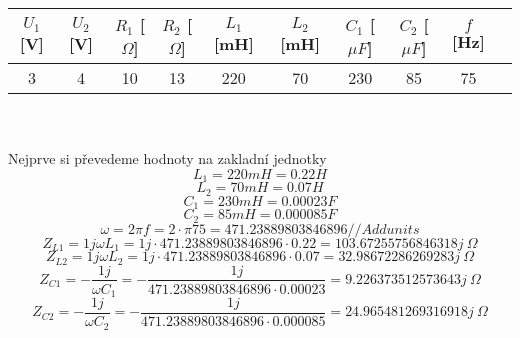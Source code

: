 \documentclass{article}
\begin{document}
\begin{tabular}{| c | c | c | c | c | c | c | c | c | c |}
  \hline
   $U_{1}$[V] & $U_{2}$ [V] & $R_{1}$ [$\Omega$]& $R_{2}$ [$\Omega$]& $L_{1}$ [mH]& $L_{2}$ [mH]& $C_{1}$ [$\mu F$]& $C_{2}$ [$\mu F$]& $f$ [Hz]\\
  \hline
  3 & 4 & 10 & 13 & 220 & 70 & 230 & 85 & 75\\ 
  \hline
\end{tabular}\\
\\
Nejprve si převedeme hodnoty na zakladní jednotky\\
\[
  L_1 = 220 mH = 0.22 H
\]
\[
  L_2 = 70 mH = 0.07 H
\]
\[
  C_1 = 230 mH = 0.00023 F
\]
\[
  C_2 = 85 mH = 0.000085 F
\]
\[
  \omega = 2\pi f 
  = 2 \cdot \pi 75
  = 471.23889803846896 // Add units 
\]
\[
  Z_{L1} = 1j \omega L_1
  = 1j \cdot 471.23889803846896 \cdot 0.22 
  = 103.67255756846318j\ \Omega
\]
\[
  Z_{L2} = 1j \omega L_2
  = 1j \cdot 471.23889803846896 \cdot 0.07 
  = 32.98672286269283j \ \Omega
\]
\[
  Z_{C1} = -\displaystyle\frac{1j}{\omega C_1}
  = - \displaystyle\frac{1j}{471.23889803846896 \cdot 0.00023}
  = 9.226373512573643j\ \Omega
\]
\[
  Z_{C2} = -\displaystyle\frac{1j}{\omega C_2}
  = - \displaystyle\frac{1j}{471.23889803846896 \cdot 0.000085}
  = 24.965481269316918j\ \Omega
\]
\end{document}
